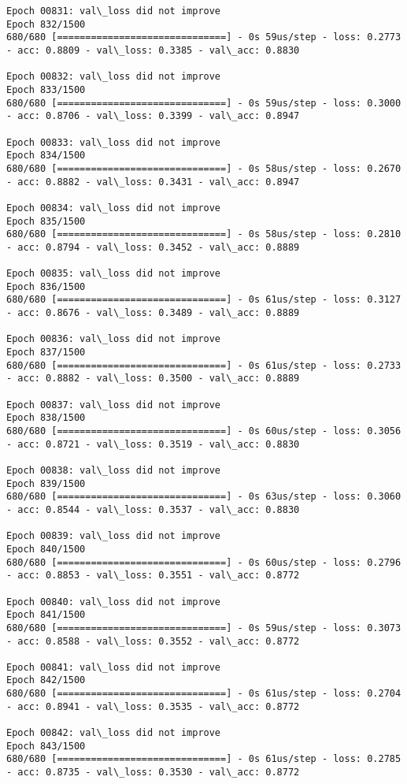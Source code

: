 \documentclass[11pt]{article}
\begin{document}
\begin{Verbatim}[commandchars=\\\{\}]
Epoch 00831: val\_loss did not improve
Epoch 832/1500
680/680 [==============================] - 0s 59us/step - loss: 0.2773 - acc: 0.8809 - val\_loss: 0.3385 - val\_acc: 0.8830

Epoch 00832: val\_loss did not improve
Epoch 833/1500
680/680 [==============================] - 0s 59us/step - loss: 0.3000 - acc: 0.8706 - val\_loss: 0.3399 - val\_acc: 0.8947

Epoch 00833: val\_loss did not improve
Epoch 834/1500
680/680 [==============================] - 0s 58us/step - loss: 0.2670 - acc: 0.8882 - val\_loss: 0.3431 - val\_acc: 0.8947

Epoch 00834: val\_loss did not improve
Epoch 835/1500
680/680 [==============================] - 0s 58us/step - loss: 0.2810 - acc: 0.8794 - val\_loss: 0.3452 - val\_acc: 0.8889

Epoch 00835: val\_loss did not improve
Epoch 836/1500
680/680 [==============================] - 0s 61us/step - loss: 0.3127 - acc: 0.8676 - val\_loss: 0.3489 - val\_acc: 0.8889

Epoch 00836: val\_loss did not improve
Epoch 837/1500
680/680 [==============================] - 0s 61us/step - loss: 0.2733 - acc: 0.8882 - val\_loss: 0.3500 - val\_acc: 0.8889

Epoch 00837: val\_loss did not improve
Epoch 838/1500
680/680 [==============================] - 0s 60us/step - loss: 0.3056 - acc: 0.8721 - val\_loss: 0.3519 - val\_acc: 0.8830

Epoch 00838: val\_loss did not improve
Epoch 839/1500
680/680 [==============================] - 0s 63us/step - loss: 0.3060 - acc: 0.8544 - val\_loss: 0.3537 - val\_acc: 0.8830

Epoch 00839: val\_loss did not improve
Epoch 840/1500
680/680 [==============================] - 0s 60us/step - loss: 0.2796 - acc: 0.8853 - val\_loss: 0.3551 - val\_acc: 0.8772

Epoch 00840: val\_loss did not improve
Epoch 841/1500
680/680 [==============================] - 0s 59us/step - loss: 0.3073 - acc: 0.8588 - val\_loss: 0.3552 - val\_acc: 0.8772

Epoch 00841: val\_loss did not improve
Epoch 842/1500
680/680 [==============================] - 0s 61us/step - loss: 0.2704 - acc: 0.8941 - val\_loss: 0.3535 - val\_acc: 0.8772

Epoch 00842: val\_loss did not improve
Epoch 843/1500
680/680 [==============================] - 0s 61us/step - loss: 0.2785 - acc: 0.8735 - val\_loss: 0.3530 - val\_acc: 0.8772


\end{Verbatim}
\end{document}
